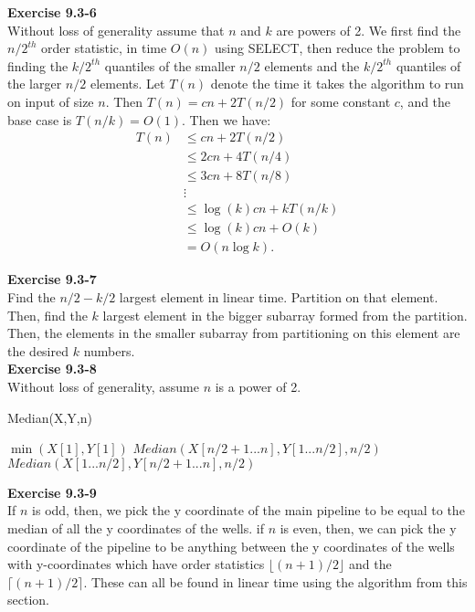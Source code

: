 \documentclass{article}
\begin{document}
\noindent\textbf{Exercise 9.3-6}\\

Without loss of generality assume that $n$ and $k$ are powers of 2. We first find the $n/2^{th}$ order statistic, in time $O(n)$ using SELECT, then reduce the problem to finding the $k/2^{th}$ quantiles of the smaller $n/2$ elements and the $k/2^{th}$ quantiles of the larger $n/2$ elements.  Let $T(n)$ denote the time it takes the algorithm to run on input of size $n$.  Then $T(n) = cn+ 2T(n/2)$ for some constant $c$, and the base case is $T(n/k) = O(1)$.  Then we have:
\begin{align*}
T(n) &\leq cn+2T(n/2) \\
&\leq 2cn + 4T(n/4) \\
&\leq 3cn + 8T(n/8) \\
&\vdots \\
& \leq \log(k)cn + kT(n/k) \\
&\leq \log(k)cn + O(k) \\
&= O(n \log k).
\end{align*}


\noindent\textbf{ Exercise 9.3-7} \\

Find the $n/2-k/2$ largest element in linear time. Partition on that element. Then, find the $k$ largest element in the bigger subarray formed from the partition. Then, the elements in the smaller subarray from partitioning on this element are the desired $k$ numbers.\\

\noindent\textbf{Exercise 9.3-8}\\

Without loss of generality, assume $n$ is a power of 2. 

\begin{algorithm}
\caption{Median(X,Y,n)}
\begin{algorithmic}
	\State \Return $\min(X[1], Y[1])$
\EndIf
{}
	\State \Return $Median(X[ n/2 + 1 ...n], Y[1...n/2],n/2)$
\Else {}
	\State \Return $Median(X[1...n/2], Y[n/2+1...n], n/2)$
\EndIf
\EndIf
\end{algorithmic}
\end{algorithm}

\noindent\textbf{ Exercise 9.3-9} \\

If $n$ is odd, then, we pick the y coordinate of the main pipeline to be equal to the median of all the y coordinates of the wells. if $n$ is even, then, we can pick the y coordinate of the pipeline to be anything between the y coordinates of the wells with y-coordinates which have order statistics $\lfloor (n+1)/2\rfloor$ and the $\lceil (n+1)/2 \rceil$. These can all be found in linear time using the algorithm from this section.\\
\end{document}
